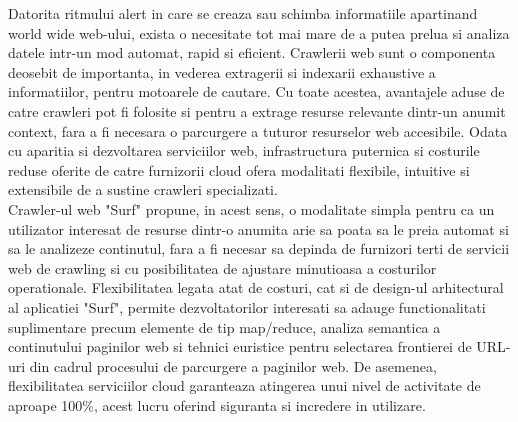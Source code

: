 Datorita ritmului alert in care se creaza sau schimba informatiile apartinand world wide web-ului, exista o necesitate tot mai mare de a putea prelua si analiza datele intr-un mod automat, rapid si eficient. Crawlerii web sunt o componenta deosebit de importanta, in vederea extragerii si indexarii exhaustive a informatiilor, pentru motoarele de cautare. Cu toate acestea, avantajele aduse de catre crawleri pot fi folosite si pentru a extrage resurse relevante dintr-un anumit context, fara a fi necesara o parcurgere a tuturor resurselor web accesibile. Odata cu aparitia si dezvoltarea serviciilor web, infrastructura puternica si costurile reduse oferite de catre furnizorii cloud ofera modalitati flexibile, intuitive si extensibile de a sustine crawleri specializati. 
\\

Crawler-ul web "Surf" propune, in acest sens, o modalitate simpla pentru ca un utilizator interesat de resurse dintr-o anumita arie sa poata sa le preia automat si sa le analizeze continutul, fara a fi necesar sa depinda de furnizori terti de servicii web de crawling si cu posibilitatea de ajustare minutioasa a costurilor operationale. Flexibilitatea legata atat de costuri, cat si de design-ul arhitectural al aplicatiei "Surf", permite dezvoltatorilor interesati sa adauge functionalitati suplimentare precum elemente de tip map/reduce, analiza semantica a continutului paginilor web si tehnici euristice pentru selectarea frontierei de URL-uri din cadrul procesului de parcurgere a paginilor web. De asemenea, flexibilitatea serviciilor cloud garanteaza atingerea unui nivel de activitate de aproape 100\%, acest lucru oferind siguranta si incredere in utilizare.